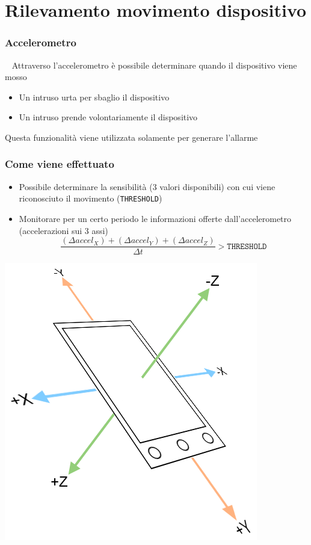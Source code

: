 \documentclass{beamer}
\begin{document}
\section{Rilevamento movimento dispositivo}
\begin{frame}
\frametitle{Accelerometro}
\begin{block}{~}
Attraverso l'accelerometro è possibile determinare quando il dispositivo viene mosso
\end{block}
\begin{itemize}
  \item Un intruso urta per sbaglio il dispositivo
  \item Un intruso prende volontariamente il dispositivo
\end{itemize}

Questa funzionalità viene utilizzata solamente per generare l'allarme
\end{frame}

\begin{frame}
\frametitle{Come viene effettuato}
\begin{minipage}[c]{.7\textwidth}
\begin{itemize}
  \item Possibile determinare la sensibilità (3 valori disponibili) con cui viene riconosciuto il movimento (\texttt{THRESHOLD})
  \item Monitorare per un certo periodo le informazioni offerte dall'accelerometro (accelerazioni sui 3 assi)
        {\footnotesize\[\frac{(\Delta accel_X) + (\Delta accel_Y) + (\Delta accel_Z)}{\Delta t} > \texttt{THRESHOLD}\]}
\end{itemize}
\end{minipage}\begin{minipage}[c]{.25\textwidth}
\includegraphics[scale=.3]{./img/accelerometer.png}
\end{minipage}
\end{frame}
\end{document}
